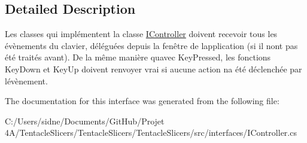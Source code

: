 \subsection{Detailed Description}
Les classes qui implémentent la classe \hyperlink{interface_tentacle_slicers_1_1interfaces_1_1_i_controller}{I\+Controller} doivent recevoir tous les évènements du clavier, déléguées depuis la fenêtre de l\textquotesingle{}application (si il n\textquotesingle{}ont pas été traités avant). De la même manière qu\textquotesingle{}avec Key\+Pressed, les fonctions Key\+Down et Key\+Up doivent renvoyer vrai si aucune action n\textquotesingle{}a été déclenchée par l\textquotesingle{}évènement. 



The documentation for this interface was generated from the following file\+:\begin{DoxyCompactItemize}
\item 
C\+:/\+Users/sidne/\+Documents/\+Git\+Hub/\+Projet 4\+A/\+Tentacle\+Slicers/\+Tentacle\+Slicers/\+Tentacle\+Slicers/src/interfaces/I\+Controller.\+cs\end{DoxyCompactItemize}
